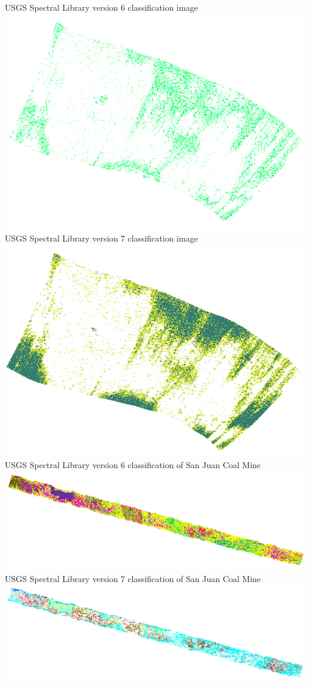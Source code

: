 \documentclass[onecolumn, draftclsnofoot,10pt, compsoc]{IEEEtran}
\begin{document}
USGS Spectral Library version 6 classification image
\newline
\includegraphics{S06_1}
USGS Spectral Library version 7 classification image \newline
\includegraphics{SO7_1}
USGS Spectral Library version 6 classification of San Juan Coal Mine \newline
\includegraphics{SO6_2}
USGS Spectral Library version 7 classification of San Juan Coal Mine \newline
\includegraphics{S07_2}
\end{document}
